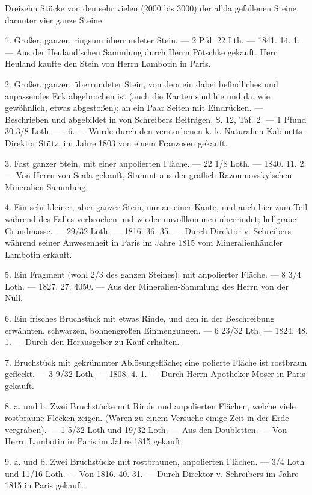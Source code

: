 \documentclass[a4paper, 11pt, oneside, polutonikogreek, german]{article}
\begin{document}
Dreizehn Stücke von den sehr vielen (2000 bis 3000) der allda gefallenen Steine, darunter vier ganze Steine.

1. Großer, ganzer, ringsum überrundeter Stein. — 2 Pfd. 22 Lth. — 1841. 14. 1. — Aus der Heuland'schen Sammlung durch Herrn Pötschke gekauft. Herr Heuland kaufte den Stein von Herrn Lambotin in Paris.

2. Großer, ganzer, überrundeter Stein, von dem ein dabei befindliches und anpassendes Eck abgebrochen ist (auch die Kanten sind hie und da, wie gewöhnlich, etwas abgestoßen); an ein Paar Seiten mit Eindrücken. — Beschrieben und abgebildet in von Schreibers Beiträgen, S. 12, Taf. 2. — 1 Pfund 30 3/8 Loth — . 6. — Wurde durch den verstorbenen k. k. Naturalien-Kabinetts-Direktor Stütz, im Jahre 1803 von einem Franzosen gekauft.

3. Fast ganzer Stein, mit einer anpolierten Fläche. — 22 1/8 Loth. — 1840. 11. 2. — Von Herrn von Scala gekauft, Stammt aus der gräflich Razoumovsky'schen Mineralien-Sammlung.

4. Ein sehr kleiner, aber ganzer Stein, nur an einer Kante, und auch hier zum Teil während des Falles verbrochen und wieder unvollkommen überrindet; hellgraue Grundmasse. — 29/32 Loth. — 1816. 36. 35. — Durch Direktor v. Schreibers während seiner Anwesenheit in Paris im Jahre 1815 vom Mineralienhändler Lambotin erkauft.

5. Ein Fragment (wohl 2/3 des ganzen Steines); mit anpolierter Fläche. — 8 3/4 Loth. — 1827. 27. 4050. — Aus der Mineralien-Sammlung des Herrn von der Nüll.

6. Ein frisches Bruchstück mit etwas Rinde, und den in der Beschreibung erwähnten, schwarzen, bohnengroßen Einmengungen. — 6 23/32 Lth. — 1824. 48. 1. — Durch den Herausgeber zu Kauf erhalten.

7. Bruchstück mit gekrümmter Ablösungsfläche; eine polierte Fläche ist rostbraun gefleckt. — 3 9/32 Loth. — 1808. 4. 1. — Durch Herrn Apotheker Moser in Paris gekauft.

8. a. und b. Zwei Bruchstücke mit Rinde und anpolierten Flächen, welche viele rostbraune Flecken zeigen. (Waren zu einem Versuche einige Zeit in der Erde vergraben). — 1 5/32 Loth und 19/32 Loth. — Aus den Doubletten. — Von Herrn Lambotin in Paris im Jahre 1815 gekauft.

9. a. und b. Zwei Bruchstücke mit rostbraunen, anpolierten Flächen. — 3/4 Loth und 11/16 Loth. — Von 1816. 40. 31. — Durch Direktor v. Schreibers im Jahre 1815 in Paris gekauft.
\end{document}
